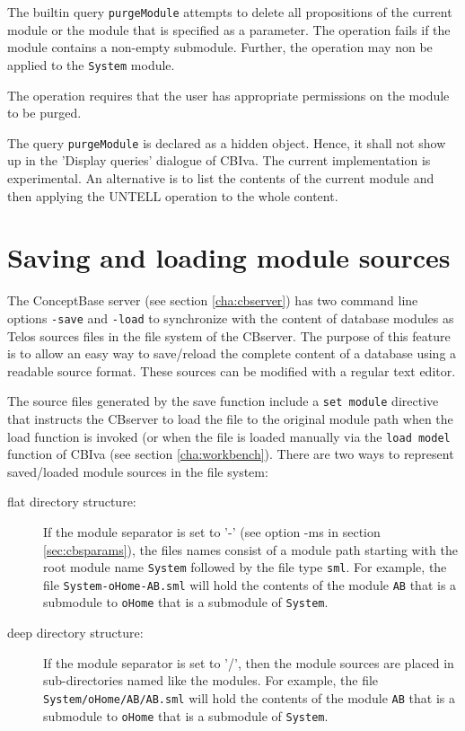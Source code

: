 The builtin query {\tt purgeModule} attempts to delete all propositions
of the current module or the module that is specified as a parameter.
The operation fails if the module contains a non-empty submodule. 
Further, the operation may non be applied to the {\tt System} module.

The operation requires that the user has appropriate permissions on the module
to be purged. 

The query {\tt purgeModule} is declared as a hidden object. Hence, it shall not show
up in the 'Display queries' dialogue of CBIva. The current implementation is experimental.
An alternative is to list the contents of the current module and then
applying the UNTELL operation to the whole content.





\section{Saving and loading module sources} \label{sec:module_sources}

The ConceptBase server (see section \ref{cha:cbserver}) has two command line
options {\tt -save} and {\tt -load} to synchronize with the content of database modules as
Telos sources files in the file system of the CBserver. The purpose
of this feature is to allow an easy way to save/reload the complete content
of a database using a readable source format. These sources can be modified
with a regular text editor. 

The source files generated by the save function include a {\tt set module}
directive that instructs the CBserver to load the file to the original
module path when the load function is invoked (or when the file is loaded
manually via the {\tt load model} function of CBIva (see section \ref{cha:workbench}).
There are two ways to represent saved/loaded module sources in the file system:

\begin{description}
\item[flat directory structure:] If the module separator is set to '-' (see option -ms in
section \ref{sec:cbsparams}), the files names consist of a module path
starting with the root module name {\tt System} followed by the file type {\tt sml}.
For example, the file {\tt System-oHome-AB.sml} will hold the contents of
the module {\tt AB} that is a submodule to {\tt oHome} that is a submodule of {\tt System}.
\item[deep directory structure:] If the module separator is set to '/', then the module sources
are placed in sub-directories named like the modules.
For example, the file {\tt System/oHome/AB/AB.sml} will hold the contents of
the module {\tt AB} that is a submodule to {\tt oHome} that is a submodule of {\tt System}.

\end{description}



